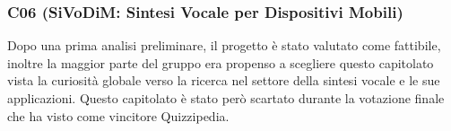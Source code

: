 \documentclass[a4paper,11pt]{article}
\begin{document}
\subsubsection{C06 (SiVoDiM: Sintesi Vocale per Dispositivi Mobili)}
Dopo una prima analisi preliminare, il progetto è stato valutato come fattibile, inoltre la maggior parte del gruppo era propenso a scegliere questo capitolato vista la curiosità globale verso la ricerca nel settore della sintesi vocale e le sue applicazioni. Questo capitolato è stato però scartato durante la votazione finale che ha visto come vincitore Quizzipedia.
\end{document}

